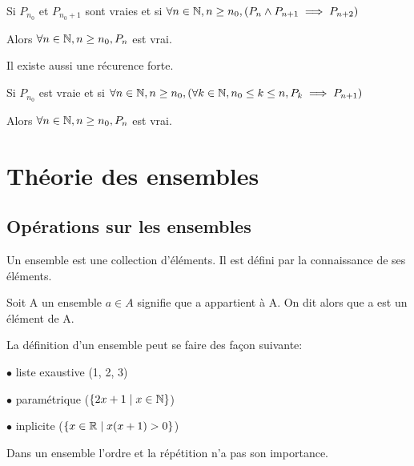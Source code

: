 \documentclass[a4paper, 12pt]{article}
\begin{document}
\begin{methode}
    Si $P_{n_0}$ et $P_{n_0+1}$ sont vraies et si $\forall n \in \mathbb{N}, n \geq n_0, (P_n \land P_{n+1} \implies P_{n+2})$
    
    Alors $\forall n \in \mathbb{N}, n \geq n_0, P_n$ est vrai.
\end{methode}

Il existe aussi une récurence forte.

\begin{methode}
    Si $P_{n_0}$ est vraie et si $\forall n \in \mathbb{N}, n \geq n_0, (\forall k \in \mathbb{N}, n_0 \leq k \leq n, P_k \implies P_{n+1})$
    
    Alors $\forall n \in \mathbb{N}, n \geq n_0, P_n$ est vrai.
\end{methode}




\section{Théorie des ensembles}

\subsection{Opérations sur les ensembles}

\begin{definition}
    Un ensemble est une collection d'éléments. Il est défini par la connaissance de ses éléments.

    Soit A un ensemble $a \in A$ signifie que a appartient à A. On dit alors que a est un élément de A.
\end{definition}

\begin{remark}
    La définition d'un ensemble peut se faire des façon suivante:

    \item $\bullet$ liste exaustive ({1, 2, 3})
    \item $\bullet$ paramétrique ($\{2x + 1 \mid x \in \mathbb{N}\}$)
    \item $\bullet$ inplicite ($\{x \in \mathbb{R} \mid x(x+1) > 0\}$)
\end{remark}

\begin{remark}
    Dans un ensemble l'ordre et la répétition n'a pas son importance.
\end{remark}
\end{document}
